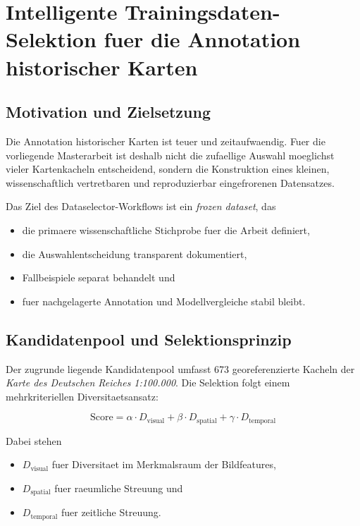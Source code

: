 \chapter{Intelligente Trainingsdaten-Selektion fuer die Annotation historischer Karten}
\label{ch:training_data_selection}

\section{Motivation und Zielsetzung}
\label{sec:motivation_training_data}

Die Annotation historischer Karten ist teuer und zeitaufwaendig. Fuer die
vorliegende Masterarbeit ist deshalb nicht die zufaellige Auswahl moeglichst
vieler Kartenkacheln entscheidend, sondern die Konstruktion eines kleinen,
wissenschaftlich vertretbaren und reproduzierbar eingefrorenen Datensatzes.

Das Ziel des Dataselector-Workflows ist ein \emph{frozen dataset}, das

\begin{itemize}
    \item die primaere wissenschaftliche Stichprobe fuer die Arbeit definiert,
    \item die Auswahlentscheidung transparent dokumentiert,
    \item Fallbeispiele separat behandelt und
    \item fuer nachgelagerte Annotation und Modellvergleiche stabil bleibt.
\end{itemize}

\section{Kandidatenpool und Selektionsprinzip}
\label{sec:algorithmic_selection}

Der zugrunde liegende Kandidatenpool umfasst 673 georeferenzierte Kacheln der
\emph{Karte des Deutschen Reiches 1:100.000}. Die Selektion folgt einem
mehrkriteriellen Diversitaetsansatz:

\begin{equation}
\text{Score} = \alpha \cdot D_{\text{visual}} + \beta \cdot D_{\text{spatial}} + \gamma \cdot D_{\text{temporal}}
\end{equation}

Dabei stehen

\begin{itemize}
    \item $D_{\text{visual}}$ fuer Diversitaet im Merkmalsraum der Bildfeatures,
    \item $D_{\text{spatial}}$ fuer raeumliche Streuung und
    \item $D_{\text{temporal}}$ fuer zeitliche Streuung.
\end{itemize}

